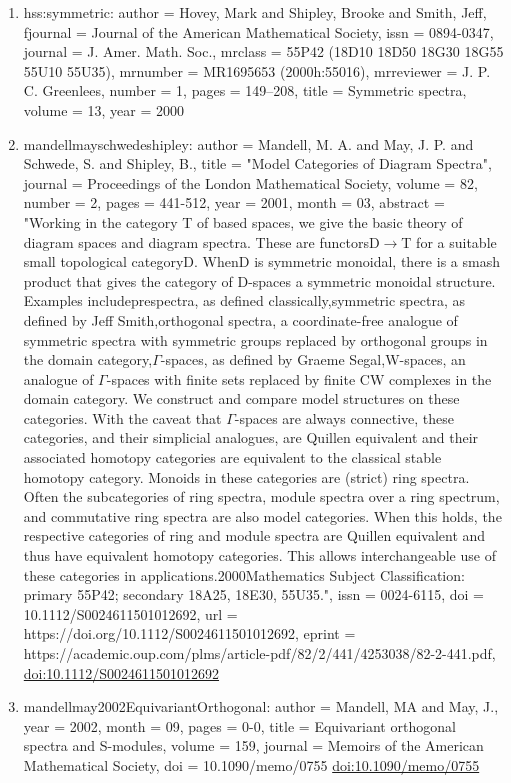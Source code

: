 \documentclass[11pt]{article}
\begin{document}
\begin{enumerate}[leftmargin=*]
  \item hss:symmetric: author = Hovey, Mark and Shipley, Brooke and Smith, Jeff, fjournal = Journal of the American Mathematical Society, issn = 0894-0347, journal = J. Amer. Math. Soc., mrclass = 55P42 (18D10 18D50 18G30 18G55 55U10 55U35), mrnumber = MR1695653 (2000h:55016), mrreviewer = J. P. C. Greenlees, number = 1, pages = 149--208, title = Symmetric spectra, volume = 13, year = 2000
  \item mandellmayschwedeshipley: author = Mandell, M. A. and May, J. P. and Schwede, S. and Shipley, B., title = "Model Categories of Diagram Spectra", journal = Proceedings of the London Mathematical Society, volume = 82, number = 2, pages = 441-512, year = 2001, month = 03, abstract = "Working in the category T of based spaces, we give the basic theory of diagram spaces and diagram spectra. These are functorsD\ensuremath{\to}T for a suitable small topological categoryD. WhenD is symmetric monoidal, there is a smash product that gives the category of D-spaces a symmetric monoidal structure. Examples includeprespectra, as defined classically,symmetric spectra, as defined by Jeff Smith,orthogonal spectra, a coordinate-free analogue of symmetric spectra with symmetric groups replaced by orthogonal groups in the domain category,\ensuremath{\Gamma}-spaces, as defined by Graeme Segal,W-spaces, an analogue of \ensuremath{\Gamma}-spaces with finite sets replaced by finite CW complexes in the domain category. We construct and compare model structures on these categories. With the caveat that \ensuremath{\Gamma}-spaces are always connective, these categories, and their simplicial analogues, are Quillen equivalent and their associated homotopy categories are equivalent to the classical stable homotopy category. Monoids in these categories are (strict) ring spectra. Often the subcategories of ring spectra, module spectra over a ring spectrum, and commutative ring spectra are also model categories. When this holds, the respective categories of ring and module spectra are Quillen equivalent and thus have equivalent homotopy categories. This allows interchangeable use of these categories in applications.2000Mathematics Subject Classification: primary 55P42; secondary 18A25, 18E30, 55U35.", issn = 0024-6115, doi = 10.1112/S0024611501012692, url = https://doi.org/10.1112/S0024611501012692, eprint = https://academic.oup.com/plms/article-pdf/82/2/441/4253038/82-2-441.pdf, \href{https://doi.org/10.1112/S0024611501012692}{doi:10.1112/S0024611501012692}
  \item mandellmay2002EquivariantOrthogonal: author = Mandell, MA and May, J., year = 2002, month = 09, pages = 0-0, title = Equivariant orthogonal spectra and S-modules, volume = 159, journal = Memoirs of the American Mathematical Society, doi = 10.1090/memo/0755 \href{https://doi.org/10.1090/memo/0755}{doi:10.1090/memo/0755}

\end{enumerate}
\end{document}
